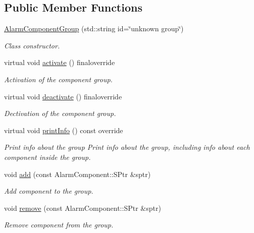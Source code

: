 \subsection*{Public Member Functions}
\begin{DoxyCompactItemize}
\item 
\hyperlink{classAlarmComponentGroup_af999ab1dac77f573df01fb400ec5d044}{Alarm\+Component\+Group} (std\+::string id=\char`\"{}unknown group\char`\"{})
\begin{DoxyCompactList}\small\item\em Class constructor. \end{DoxyCompactList}\item 
virtual void \hyperlink{classAlarmComponentGroup_ac67076993e9068dc15e8d39af29698a4}{activate} () finaloverride
\begin{DoxyCompactList}\small\item\em Activation of the component group. \end{DoxyCompactList}\item 
virtual void \hyperlink{classAlarmComponentGroup_a673cebdc7e32c522af0e7435786ea118}{deactivate} () finaloverride
\begin{DoxyCompactList}\small\item\em Dectivation of the component group. \end{DoxyCompactList}\item 
virtual void \hyperlink{classAlarmComponentGroup_a76c37915b10d54349ebf246fddbc603a}{print\+Info} () const override\hypertarget{classAlarmComponentGroup_a76c37915b10d54349ebf246fddbc603a}{}\label{classAlarmComponentGroup_a76c37915b10d54349ebf246fddbc603a}

\begin{DoxyCompactList}\small\item\em Print info about the group Print info about the group, including info about each component inside the group. \end{DoxyCompactList}\item 
void \hyperlink{classAlarmComponentGroup_ac07c12720297df1bbf1e131af6631049}{add} (const Alarm\+Component\+::\+S\+Ptr \&sptr)
\begin{DoxyCompactList}\small\item\em Add component to the group. \end{DoxyCompactList}\item 
void \hyperlink{classAlarmComponentGroup_a4e6c27c533e73d95fe622ca8ed89a9ae}{remove} (const Alarm\+Component\+::\+S\+Ptr \&sptr)
\begin{DoxyCompactList}\small\item\em Remove component from the group. \end{DoxyCompactList}\end{DoxyCompactItemize}
